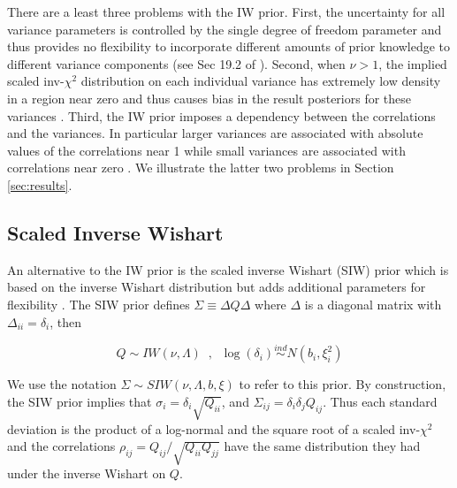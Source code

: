 \documentclass[12pt]{article}
\begin{document}
There are a least three problems with the IW prior. First, the uncertainty for all variance parameters is controlled by the single degree of freedom parameter and thus provides no flexibility to incorporate different amounts of prior knowledge to different variance components (see Sec 19.2 of \cite{bda2003}). Second, when $\nu>1$, the implied scaled inv-$\chi^2$ distribution on each individual variance has extremely low density in a region near zero and thus causes bias in the result posteriors for these variances \citep{gelman2006prior}.  Third, the IW prior imposes a dependency between the correlations and the variances. In particular larger variances are associated with absolute values of the correlations near 1 while small variances are associated with correlations near zero \citep{visualize}.  We illustrate the latter two problems in Section \ref{sec:results}.



\subsection{Scaled Inverse Wishart \label{sec:siw}}

An alternative to the IW prior is the scaled inverse Wishart (SIW) prior which is based on the inverse Wishart distribution but adds additional parameters for flexibility \citep{odomain}. The SIW prior defines $\Sigma \equiv \Delta Q \Delta $ where $\Delta$ is a diagonal matrix with $\Delta_{ii}=\delta_i$, then 

\begin{equation}
Q \sim  IW(\nu, \Lambda) \;\;, \;\; \log(\delta_i) \stackrel{ind} \sim N(b_i, \xi_i^2)
\label{eq:siw}
\end{equation} 

We use the notation $\Sigma \sim SIW(\nu, \Lambda, b, \xi)$ to refer to this prior.  By construction, the SIW prior implies that $\sigma_i = \delta_i \sqrt{Q_{ii}}$, and $\Sigma_{ij}=\delta_i\delta_jQ_{ij}$. Thus each standard deviation is the product of a log-normal and the square root of a scaled inv-$\chi^2$ and the correlations $\rho_{ij} = Q_{ij}/\sqrt{Q_{ii}Q_{jj}}$ have the same distribution they had under the inverse Wishart on $Q$.  
\end{document}
